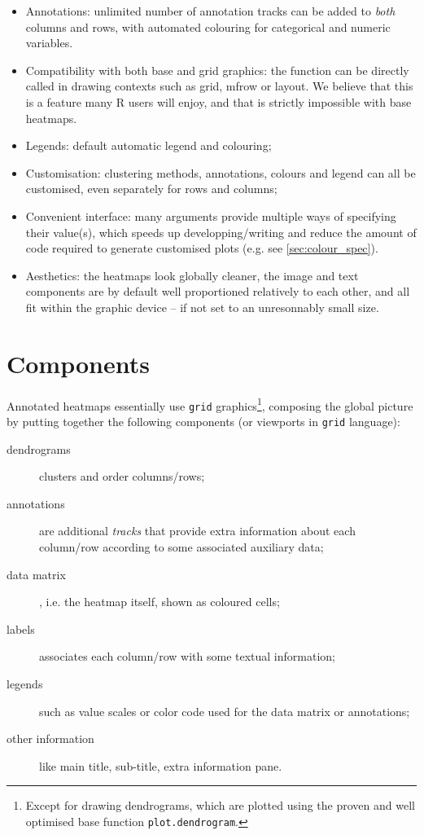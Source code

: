 \documentclass[a4paper]{article}\usepackage[]{graphicx}\usepackage[]{color}
\let\code=\texttt
\begin{document}
\begin{itemize}
\item Annotations: unlimited number of annotation tracks can be added to 
\emph{both} columns and rows, with automated colouring for categorical and 
numeric variables.
\item Compatibility with both base and grid graphics: the function can be 
directly called in drawing contexts such as grid, mfrow or layout.
We believe that this is a feature many R users will enjoy, and that is
strictly impossible with base heatmaps.
\item Legends: default automatic legend and colouring;
\item Customisation: clustering methods, annotations, colours and legend can all 
be customised, even separately for rows and columns;
\item Convenient interface: many arguments provide multiple ways of 
specifying their value(s), which speeds up developping/writing and reduce the 
amount of code required to generate customised plots (e.g. see
\cref{sec:colour_spec}).
\item Aesthetics: the heatmaps look globally cleaner, the image and text components 
are by default well proportioned relatively to each other, and all fit within 
the graphic device -- if not set to an unresonnably small size.
\end{itemize}

\section{Components}

Annotated heatmaps essentially use \code{grid} graphics\footnote{Except for
drawing dendrograms, which are plotted using the proven and well optimised base
function \code{plot.dendrogram}.}, composing the global picture by putting
together the following components (or viewports in \code{grid} language):

\begin{description}
  \item[dendrograms] clusters and order columns/rows; 
  \item[annotations] are additional \emph{tracks} that provide extra
  information about each column/row according to some associated auxiliary data;
  \item[data matrix], i.e. the heatmap itself, shown as coloured cells;
  \item[labels] associates each column/row with some textual information;
  \item[legends] such as value scales or color code used for the data matrix or
  annotations;
  \item[other information] like main title, sub-title, extra information pane.
\end{description}
\end{document}
